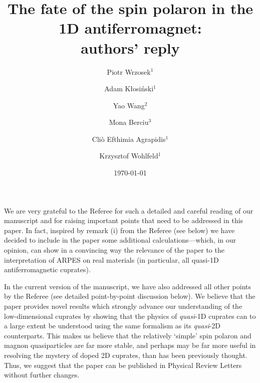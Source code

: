 \documentclass[%
 manuscript,
 amsmath,amssymb,
 aps, onecolumn,
prl,
]{revtex4-1}
\begin{document}

\title{The fate of the spin polaron in the 1D antiferromagnet: \\  authors' reply
}

\author{Piotr Wrzosek$^1$}
\author{Adam K\l{}osi\'nski$^1$}
\author{Yao Wang$^2$}
\author{Mona Berciu$^3$}
\author{Cli\`o Efthimia Agrapidis$^1$}
\author{Krzysztof Wohlfeld$^1$}
 
%

%

%

\date{\today}%

\maketitle

We are very grateful to the Referee for such a detailed and careful reading of our manuscript and for raising important points that need to be addressed in this paper. In fact, inspired by remark (i) from the Referee (see below) we have decided to include in the paper some additional calculations---which, in our opinion, can show in a convincing way the relevance of the paper to the interpretation of ARPES on real materials (in particular, all quasi-1D antiferromagnetic cuprates).

In the current version  of the manuscript, we have also addressed all other points by the Referee (see detailed point-by-point discussion below). We believe that the paper provides novel results which strongly advance our understanding of the low-dimensional cuprates by showing that the physics of {\it quasi}-1D cuprates can to a large extent be understood using the same formalism as its {\it quasi}-2D counterparts. This makes us believe that the relatively `simple'  spin polaron and magnon quasiparticles are far more stable, and perhaps may be far more useful in resolving the mystery of doped 2D cuprates, than has been previously thought. Thus, we suggest that the paper can be published in Physical Review Letters without further changes.
\\
\end{document}
